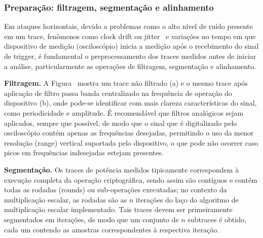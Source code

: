 \subsubsection{Preparação: filtragem, segmentação e alinhamento}

Em ataques horizontais, devido a problemas como o alto nível de ruído presente em um trace, fenômenos como clock drift ou jitter~ e variações no tempo em que dispositivo de medição (osciloscópio) inicia a medição após o recebimento do sinal de trigger, é fundamental o preprocessamento dos traces medidos antes de iniciar a análise, particularmente as operações de filtragem, segmentação e alinhamento.

\noindent \textbf{Filtragem.} A Figura~ mostra um trace não filtrado (a) e o mesmo trace após aplicação de filtro passa banda centralizado na frequência de operação do dispositivo (b), onde pode-se identificar com mais clareza características do sinal, como periodicidade e amplitude. É recomendável que filtros analógicos sejam aplicados, sempre que possível, de modo que o sinal que é digitalizado pelo osciloscópio contém apenas as frequências desejadas, permitindo o uso da menor resolução (range) vertical suportada pelo dispositivo, o que pode não ocorrer caso picos em frequências indesejadas estejam presentes.

\noindent \textbf{Segmentação.} Os traces de potência medidos tipicamente correspondem à execução completa da operação criptográfica, sendo assim são contíguos e contêm todas as rodadas (rounds) ou sub-operações executadas; no contexto da multiplicação escalar, as rodadas são as $n$ iterações do laço do algoritmo de multiplicação escalar implementado. Tais traces devem ser primeiramente segmentados em iterações, de modo que um conjunto de $n$ subtraces é obtido, cada um contendo as amostras correspondentes à respectiva iteração.


